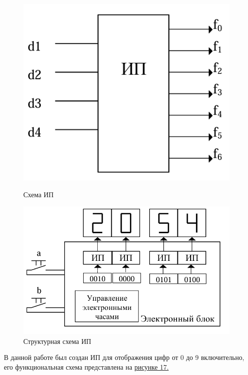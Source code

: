 \documentclass[11pt,a4paper,final]{article} %
\begin{document}
\begin{figure}[ht]
	\centering
	\begin{minipage}{0.45\textwidth}
		\centering
		\includegraphics[width=\linewidth]{img/IC1.png}
		\caption{Схема ИП}
		\label{fig:IC1}
	\end{minipage}\hfill
	\hspace{0.5cm}
	\begin{minipage}{0.51\textwidth}
		\centering
		\includegraphics[width=\linewidth]{img/IC2.png}
		\caption{Структурная схема ИП}
		\label{fig:IC2}
	\end{minipage}
\end{figure}

В данной работе был создан ИП для отображения цифр от 0 до 9 включительно, его функциональная схема представлена на \hyperref[fig:IC]{рисунке 17.}
\end{document}
